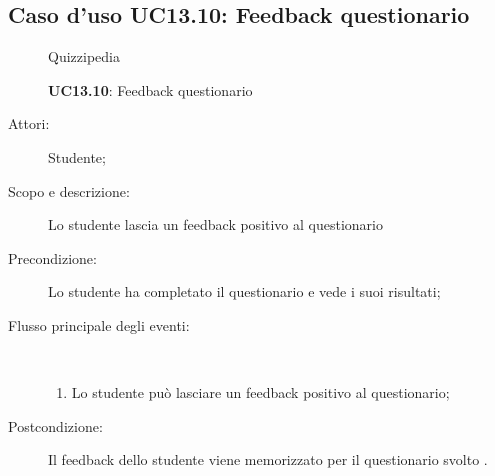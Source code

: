 \subsection{Caso d'uso UC13.10: Feedback questionario}
	\begin{figure}[H]
		\centering
		\begin{resizedtikzpicture}{\textwidth}
		\begin{umlsystem}[x=0, fill=lightgray!20]{Quizzipedia}
		\end{umlsystem}
		\end{resizedtikzpicture}
		\caption{\textbf{UC13.10}: Feedback questionario}
		\label{UC13.10}
	\end{figure}
\begin{description}
\item[Attori:] Studente;
\item[Scopo e descrizione:] Lo studente lascia un feedback positivo al questionario
      \item[Precondizione:] Lo studente ha completato il questionario e vede i suoi risultati;

        \item[Flusso principale degli eventi:] \ 
 \begin{enumerate}
          \item Lo studente può lasciare un feedback positivo al questionario;

      \end{enumerate}
    \item[Postcondizione:] Il feedback dello studente viene memorizzato per il questionario svolto .
  \end{description}
\hypertarget{UC13.11}{}
